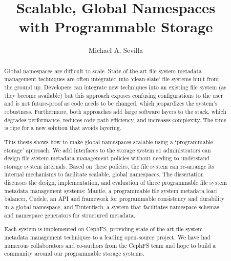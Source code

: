 \title{Scalable, Global Namespaces\\with Programmable Storage}
\author{Michael A. Sevilla}
\deanlinethree{}

\begin{frontmatter}
	\maketitle\copyrightpage\tableofcontents\listoffigures\listoftables
	\begin{abstract}

Global namespaces are difficult to scale. State-of-the-art file system metadata
management techniques are often integrated into `clean-slate' file systems
built from the ground up. Developers can integrate new techniques into an
existing file system (as they become available) but this approach exposes
confusing configurations to the user and is not future-proof as code needs to
be changed, which jeopardizes the system's robustness. Furthermore, both
approaches add large software layers to the stack, which degrades performance,
reduces code path efficiency, and increases complexity. The time is ripe for a
new solution that avoids layering.

This thesis shows how to make global namespaces scalable using a `programmable
storage' approach. We add interfaces to the storage system so administrators
can design file system metadata management policies without needing to
understand storage system internals. Based on these policies, the file system
can re-arrange its internal mechanisms to facilitate scalable, global
namespaces.  The dissertation discusses the design, implementation, and
evaluation of three programmable file system metadata management systems:
Mantle, a programmable file system metadata load balancer, Cudele, an API and
framework for programmable consistency and durability in a global namespace,
and Tintenfisch, a system that facilitates namespace schemas and namespace
generators for structured metadata.

Each system is implemented on CephFS, providing state-of-the-art file system
metadata management techniques to a leading open-source project. We have had
numerous collaborators and co-authors from the CephFS team and hope to build a
community around our programmable storage systems.


\end{abstract}
\end{frontmatter}
